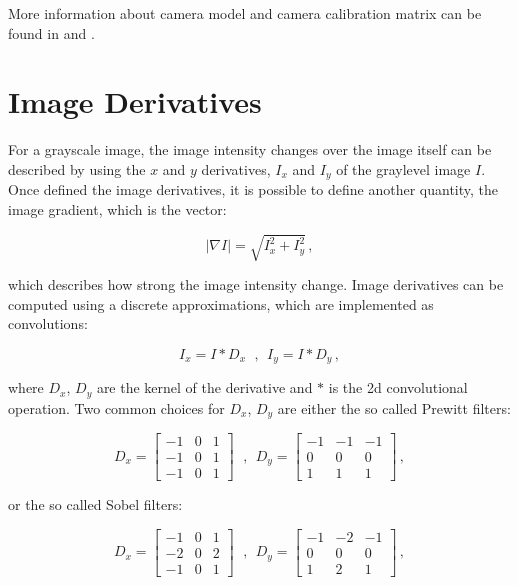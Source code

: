 More information about camera model and camera calibration matrix can be found in \cite{10.5555/861369} and \cite{Pollefeys2004}.

\section{Image Derivatives}\label{sec:imagegradient}
For a grayscale image, the image intensity changes over the image itself can be described by using the $x$ and $y$ derivatives, $I_x$ and $I_y$ of the graylevel image $I$.
Once defined the image derivatives, it is possible to define another quantity, the image gradient, which is the vector:

\begin{equation*}
  |\nabla I| = \sqrt{I_x^2 + I_y^2} \,,
\end{equation*}

which describes how strong the image intensity change. Image derivatives can be computed using a discrete approximations, which are implemented as convolutions:

\begin{equation*}
  I_x = I * D_x \ \ \,, \ \ I_y = I * D_y \,,
\end{equation*}

where $D_x$, $D_y$ are the kernel of the derivative and $*$ is the \acrshort{2d} convolutional operation. Two common choices for $D_x$, $D_y$ are either the so called Prewitt filters:

\begin{equation*}
  D_x = \begin{bmatrix}
    -1 & 0 & 1 \\
    -1 & 0 & 1 \\
    -1 & 0 & 1
  \end{bmatrix} \ \ \,,  \ \
  D_y = \begin{bmatrix}
    -1 & -1 & -1 \\
    0  & 0  & 0  \\
    1  & 1  & 1
  \end{bmatrix}\,,
\end{equation*}

or the so called Sobel filters:

\begin{equation*}
  D_x = \begin{bmatrix}
    -1 & 0 & 1 \\
    -2 & 0 & 2 \\
    -1 & 0 & 1
  \end{bmatrix} \ \ \,,  \ \
  D_y = \begin{bmatrix}
    -1 & -2 & -1 \\
    0  & 0  & 0  \\
    1  & 2  & 1
  \end{bmatrix}\,,
\end{equation*}

